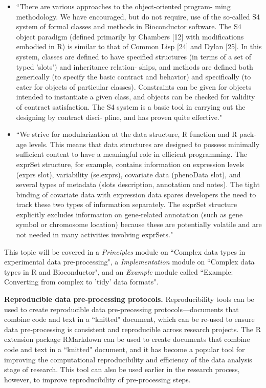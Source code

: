 \documentclass[pdftex,english,11pt,parskip=half]{scrartcl}
\begin{document}
\begin{itemize}
\item ``There are various approaches to the object-oriented program- ming methodology. We have encouraged, but do not require, use of the so-called S4 system of formal classes and methods in Bioconductor software. The S4 object paradigm (defined primarily by Chambers [12] with modifications embodied in R) is similar to that of Common Lisp [24] and Dylan [25]. In this system, classes are defined to have specified structures (in terms of a set of typed 'slots') and inheritance relation- ships, and methods are defined both generically (to specify the basic contract and behavior) and specifically (to cater for objects of particular classes). Constraints can be given for objects intended to instantiate a given class, and objects can be checked for validity of contract satisfaction. The S4 system is a basic tool in carrying out the designing by contract disci- pline, and has proven quite effective." \cite{gentleman2004bioconductor}
\item ``We strive for modularization at the data structure, R function and R pack- age levels. This means that data structures are designed to possess minimally sufficient content to have a meaningful role in efficient programming. The exprSet structure, for example, contains information on expression levels (exprs slot), variability (se.exprs), covariate data (phenoData slot), and several types of metadata (slots description, annotation and notes). The tight binding of covariate data with expression data spares developers the need to track these two types of information separately. The exprSet structure explicitly excludes information on gene-related annotation (such as gene symbol or chromosome location) because these are potentially volatile and are not needed in many activities involving exprSets." \cite{gentleman2004bioconductor}
\end{itemize}

This topic will be covered in a \textit{Principles} module on ``Complex data types in
experimental data pre-processing", a \textit{Implementation} module on ``Complex
data types in R and Bioconductor", and an \textit{Example} module called
``Example: Converting from complex to 'tidy' data formats".

\textbf{Reproducible data pre-processing protocols.} Reproducibility tools can be used to create reproducible data pre-precessing protocols---documents that combine code and text in a ``knitted" document, which can be re-used to ensure data pre-processing is consistent and reproducible across research projects. The R extension package RMarkdown can be used to create documents that combine code and text in a 
``knitted" document, and it has become a popular tool 
for improving the computational reproducibility and 
efficiency of the data analysis stage of research. This tool can also be used earlier in the research process, however, to improve reproducibility of pre-processing steps. 
\end{document}
